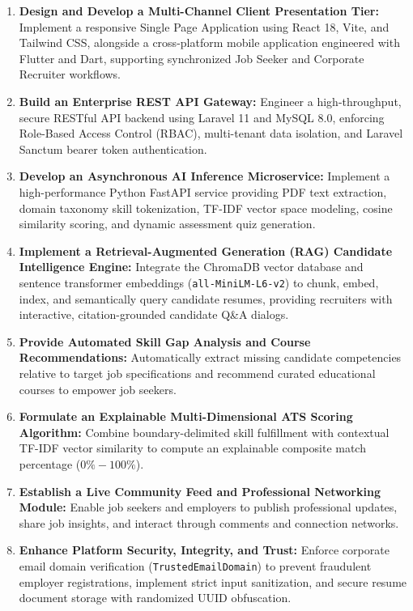 \begin{enumerate}
    \item \textbf{Design and Develop a Multi-Channel Client Presentation Tier:} Implement a responsive Single Page Application using React 18, Vite, and Tailwind CSS, alongside a cross-platform mobile application engineered with Flutter and Dart, supporting synchronized Job Seeker and Corporate Recruiter workflows.
    \item \textbf{Build an Enterprise REST API Gateway:} Engineer a high-throughput, secure RESTful API backend using Laravel 11 and MySQL 8.0, enforcing Role-Based Access Control (RBAC), multi-tenant data isolation, and Laravel Sanctum bearer token authentication.
    \item \textbf{Develop an Asynchronous AI Inference Microservice:} Implement a high-performance Python FastAPI service providing PDF text extraction, domain taxonomy skill tokenization, TF-IDF vector space modeling, cosine similarity scoring, and dynamic assessment quiz generation.
    \item \textbf{Implement a Retrieval-Augmented Generation (RAG) Candidate Intelligence Engine:} Integrate the ChromaDB vector database and sentence transformer embeddings (\texttt{all-MiniLM-L6-v2}) to chunk, embed, index, and semantically query candidate resumes, providing recruiters with interactive, citation-grounded candidate Q\&A dialogs.
    \item \textbf{Provide Automated Skill Gap Analysis and Course Recommendations:} Automatically extract missing candidate competencies relative to target job specifications and recommend curated educational courses to empower job seekers.
    \item \textbf{Formulate an Explainable Multi-Dimensional ATS Scoring Algorithm:} Combine boundary-delimited skill fulfillment with contextual TF-IDF vector similarity to compute an explainable composite match percentage ($0\% - 100\%$).
    \item \textbf{Establish a Live Community Feed and Professional Networking Module:} Enable job seekers and employers to publish professional updates, share job insights, and interact through comments and connection networks.
    \item \textbf{Enhance Platform Security, Integrity, and Trust:} Enforce corporate email domain verification (\texttt{TrustedEmailDomain}) to prevent fraudulent employer registrations, implement strict input sanitization, and secure resume document storage with randomized UUID obfuscation.
\end{enumerate}

